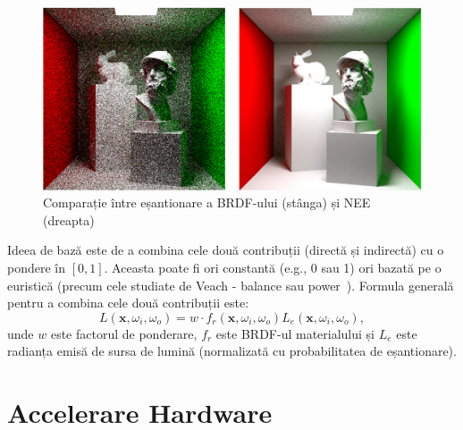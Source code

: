 \documentclass[12pt,a4paper]{report}
\numberwithin{equation}{section} %
\begin{document}
\begin{figure}[ht]
	\centering
	\includegraphics[width=\textwidth]{pics/nee.png}
	\caption{Comparație între eșantionare a BRDF-ului (stânga) și NEE (dreapta)\protect\footnotemark}
	\label{fig:nee}
\end{figure}

Ideea de bază este de a combina cele două contribuții (directă și indirectă)
cu o pondere în $[0, 1]$. Aceasta poate fi ori constantă (e.g., 0 sau 1) ori
bazată pe o euristică (precum cele studiate de Veach - balance sau power~\cite{Veach,VeachPower}).
Formula generală pentru a combina cele două contribuții este:
\begin{equation}\label{eq:nee}
	L(\mathbf{x}, \omega_i, \omega_o) = w\cdot f_{r}(\mathbf{x}, \omega_i, \omega_o) L_e(\mathbf{x}, \omega_i, \omega_o),
\end{equation}
unde $w$ este factorul de ponderare, $f_{r}$ este BRDF-ul materialului și $L_e$
este radianța emisă de sursa de lumină (normalizată cu probabilitatea de eșantionare).
\section{Accelerare Hardware}
\end{document}
